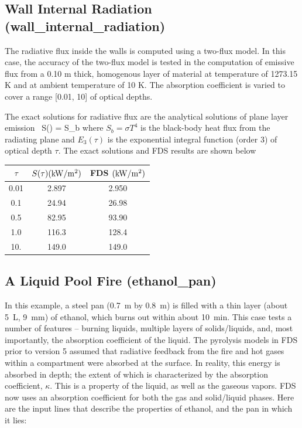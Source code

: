 \documentclass[11pt]{book}
\begin{document}
\clearpage
\subsection{Wall Internal Radiation ({\bf wall\_internal\_radiation}) }


The radiative flux inside the walls is computed using a two-flux
model.  In this case, the accuracy of the two-flux model is tested in
the computation of emissive flux from a 0.10 m thick, homogenous layer
of material at temperature of 1273.15 K and at ambient temperature of
10 K. The absorption coefficient is varied to cover a range [0.01, 10]
of optical depths.

The exact solutions for radiative flux are the analytical solutions
of plane layer emission~\cite{Zeldovich:1}
\be
S(\tau) = S_b
\ee
where $S_b = \sigma T^4$ is the black-body heat flux from
the radiating plane and $E_3(\tau)$ is the exponential
integral function (order 3) of optical depth $\tau$. The exact
solutions and FDS results are shown below

\begin{center}
\begin{tabular}{|c|c|c|} \hline
$\tau$ & $S(\tau) {\rm (kW/m^2)}$ & FDS $\rm(kW/m^2)$ \\ \hline\hline
0.01  & 2.897       & 2.950 \\
0.1   & 24.94       & 26.98 \\
0.5   & 82.95       & 93.90 \\
1.0   & 116.3       & 128.4 \\
10.   & 149.0       & 149.0 \\ \hline
\end{tabular}
\end{center}


\clearpage
\subsection{A Liquid Pool Fire ({\bf ethanol\_pan}) }

In this example, a steel pan (0.7~m by 0.8~m) is filled with a thin layer (about 5~L, 9~mm) of ethanol, which burns out within about 10~min. This case tests a number of features -- burning
liquids, multiple layers of solids/liquids, and, most importantly, the absorption coefficient of the liquid. The pyrolysis models in FDS prior to version 5
assumed that radiative feedback from the fire and hot gases within a compartment were absorbed at the surface. In reality, this energy is absorbed in
depth; the extent of which is characterized by the absorption coefficient, $\kappa$. This is a property of the liquid, as well as the gaseous vapors. FDS now uses
an absorption coefficient for both the gas and solid/liquid phases. Here are the input lines that describe the properties of ethanol, and the pan in which it lies:
\end{document}
